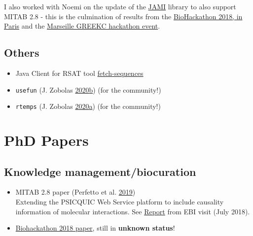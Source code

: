 \documentclass[
  12pt,
]{book}
\providecommand{\tightlist}{%
  \setlength{\itemsep}{0pt}\setlength{\parskip}{0pt}}
\begin{document}
I also worked with Noemi on the update of the \href{https://github.com/MICommunity/psi-jami}{JAMI}
library to also support MITAB 2.8 - this is the culmination of results from the
\href{https://2018.biohackathon-europe.org/}{BioHackathon 2018, in Paris} and the
\href{https://github.com/GREEKC/hackathon-marseille/tree/master/project_descriptions/causal_psicquic}{Marseille GREEKC hackathon event}.

\hypertarget{others}{%
\section*{Others}\label{others}}

\begin{itemize}
\tightlist
\item
  Java Client for RSAT tool \href{https://github.com/bblodfon/rsat-rest-java-clients}{fetch-sequences}
\item
  \texttt{usefun} (J. Zobolas \protect\hyperlink{ref-R-usefun}{2020}\protect\hyperlink{ref-R-usefun}{b}) (for the community!)
\item
  \texttt{rtemps} (J. Zobolas \protect\hyperlink{ref-R-rtemps}{2020}\protect\hyperlink{ref-R-rtemps}{a}) (for the community!)
\end{itemize}

\hypertarget{phd-papers}{%
\chapter{PhD Papers}\label{phd-papers}}

\hypertarget{knowledge-managementbiocuration}{%
\section*{Knowledge management/biocuration}\label{knowledge-managementbiocuration}}

\begin{itemize}
\tightlist
\item
  MITAB 2.8 paper (Perfetto et al. \protect\hyperlink{ref-Perfetto2019}{2019})\\
  Extending the PSICQUIC Web Service platform to include causality information of molecular interactions.
  See \href{http://tiny.cc/psicquic-mitab28}{Report} from EBI visit (July 2018).
\item
  \href{https://www.tinyurl.com/bh2018write}{Biohackathon 2018 paper}, still in \textbf{unknown status}!
\end{itemize}
\end{document}
